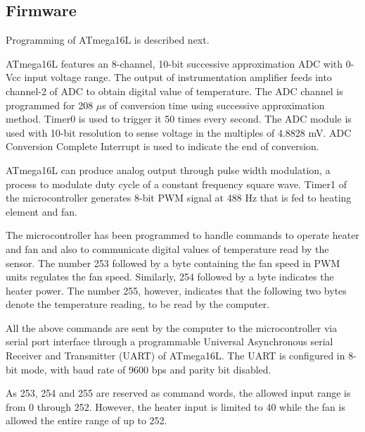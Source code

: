 \subsection{Firmware}
Programming of ATmega16L is described next.

ATmega16L features an 8-channel, 10-bit successive approximation ADC
with 0-Vcc input voltage range. The output of instrumentation
amplifier feeds into channel-2 of ADC to obtain digital value of
temperature. The ADC channel is programmed for 208 $\mu$s of
conversion time using successive approximation method. Timer0 is used
to trigger it 50 times every second. The ADC module is used with
10-bit resolution to sense voltage in the multiples of 4.8828 mV. ADC
Conversion Complete Interrupt is used to indicate the end of
conversion.

ATmega16L can produce analog output through pulse width modulation, a
process to modulate duty cycle of a constant frequency square wave.
Timer1 of the microcontroller generates 8-bit PWM signal at 488 Hz
that is fed to heating element and fan.


The microcontroller has been programmed to handle commands to
operate heater and fan and also to communicate digital values of
temperature read by the sensor.  The number 253 followed by a byte
containing the fan speed in PWM units regulates the fan speed.
Similarly, 254 followed by a byte indicates the heater power.  The
number 255, however, indicates that the following two bytes denote
the temperature reading, to be read by the computer.

All the above commands are sent by the computer to the microcontroller
via serial port interface through a programmable Universal
Asynchronous serial Receiver and Transmitter (UART) of ATmega16L. The
UART is configured in 8-bit mode, with baud rate of 9600 bps and
parity bit disabled.

As 253, 254 and 255 are reserved as command words, the allowed input
range is from 0 through 252.  However, the heater input is limited to
40 while the fan is allowed the entire range of up to 252.

